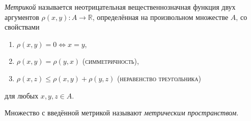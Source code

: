 \begin{definition*}
  \emph{Метрикой} называется неотрицательная вещественнозначная функция двух
  аргументов $ \rho(x, y)\colon A \to \mathbb R$,
  определённая на произвольном множестве $ A $, со свойствами
  \begin{enumerate}[label=\alph*)]
    \item $ \rho(x, y) = 0 \Leftrightarrow x = y $,
    \item $ \rho(x, y) = \rho(y,x) $ (\textsc{симметричность}),
    \item $ \rho(x, z) \leqslant \rho(x, y) + \rho(y,z) $ (\textsc{неравенство
      треугольника})
  \end{enumerate}
  для любых $ x,y,z\in A $.

  Множество с введённой метрикой называют \emph{метрическим пространством}.
\end{definition*}

